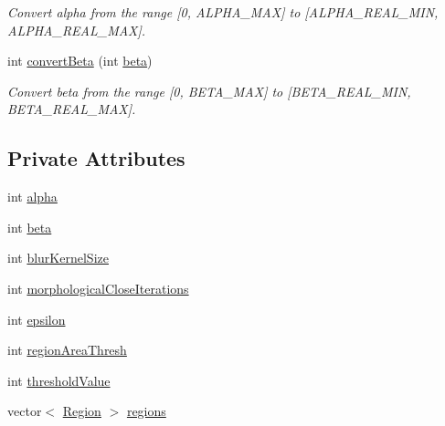 \begin{DoxyCompactItemize}
\begin{DoxyCompactList}\small\item\em Convert alpha from the range \mbox{[}0, A\-L\-P\-H\-A\-\_\-\-M\-A\-X\mbox{]} to \mbox{[}A\-L\-P\-H\-A\-\_\-\-R\-E\-A\-L\-\_\-\-M\-I\-N, A\-L\-P\-H\-A\-\_\-\-R\-E\-A\-L\-\_\-\-M\-A\-X\mbox{]}. \end{DoxyCompactList}\item 
int \hyperlink{classmultiscale_1_1analysis_1_1RegionDetector_a60083ca10a42c25d67e371506cbf5620}{convert\-Beta} (int \hyperlink{classmultiscale_1_1analysis_1_1RegionDetector_a23c831170c2264dd7e59067a1a7d3c8e}{beta})
\begin{DoxyCompactList}\small\item\em Convert beta from the range \mbox{[}0, B\-E\-T\-A\-\_\-\-M\-A\-X\mbox{]} to \mbox{[}B\-E\-T\-A\-\_\-\-R\-E\-A\-L\-\_\-\-M\-I\-N, B\-E\-T\-A\-\_\-\-R\-E\-A\-L\-\_\-\-M\-A\-X\mbox{]}. \end{DoxyCompactList}\end{DoxyCompactItemize}
\subsection*{Private Attributes}
\begin{DoxyCompactItemize}
\item 
int \hyperlink{classmultiscale_1_1analysis_1_1RegionDetector_ab768a3bbfff9835b441a889ab2cb05a6}{alpha}
\item 
int \hyperlink{classmultiscale_1_1analysis_1_1RegionDetector_a23c831170c2264dd7e59067a1a7d3c8e}{beta}
\item 
int \hyperlink{classmultiscale_1_1analysis_1_1RegionDetector_aae6ee0ec7f0a610dd8a906c1eb181bc7}{blur\-Kernel\-Size}
\item 
int \hyperlink{classmultiscale_1_1analysis_1_1RegionDetector_a700a2f299d7c56fbd1fdbec68092f23a}{morphological\-Close\-Iterations}
\item 
int \hyperlink{classmultiscale_1_1analysis_1_1RegionDetector_acf21910fadd7c6ef2810743a78a0aeb9}{epsilon}
\item 
int \hyperlink{classmultiscale_1_1analysis_1_1RegionDetector_a1f637073a3d946d000dceed01412f19a}{region\-Area\-Thresh}
\item 
int \hyperlink{classmultiscale_1_1analysis_1_1RegionDetector_a0f7469d124c0b906d199e00ea5713007}{threshold\-Value}
\item 
vector$<$ \hyperlink{classmultiscale_1_1analysis_1_1Region}{Region} $>$ \hyperlink{classmultiscale_1_1analysis_1_1RegionDetector_aa6517ceb3a58295448d32e6e41499893}{regions}
\end{DoxyCompactItemize}
